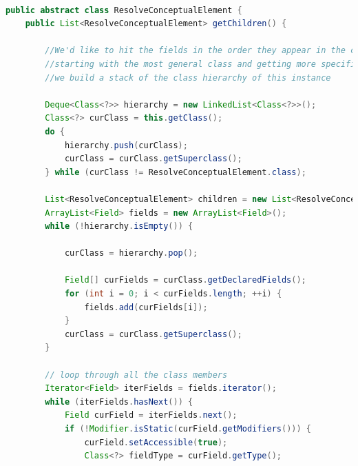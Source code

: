 \documentclass[times]{speauth}
\begin{document}
\begin{lstlisting}[language=java,caption={ResolveConceptualElement.java}]

public abstract class ResolveConceptualElement {
    public List<ResolveConceptualElement> getChildren() {

        //We'd like to hit the fields in the order they appear in the class,
        //starting with the most general class and getting more specific.  So,
        //we build a stack of the class hierarchy of this instance
        
        Deque<Class<?>> hierarchy = new LinkedList<Class<?>>();
        Class<?> curClass = this.getClass();
        do {
            hierarchy.push(curClass);
            curClass = curClass.getSuperclass();
        } while (curClass != ResolveConceptualElement.class);

        List<ResolveConceptualElement> children = new List<ResolveConceptualElement>();
        ArrayList<Field> fields = new ArrayList<Field>();
        while (!hierarchy.isEmpty()) {

            curClass = hierarchy.pop();

            Field[] curFields = curClass.getDeclaredFields();
            for (int i = 0; i < curFields.length; ++i) {
                fields.add(curFields[i]);
            }
            curClass = curClass.getSuperclass();
        }

        // loop through all the class members
        Iterator<Field> iterFields = fields.iterator();
        while (iterFields.hasNext()) {
            Field curField = iterFields.next();
            if (!Modifier.isStatic(curField.getModifiers())) {
                curField.setAccessible(true);
                Class<?> fieldType = curField.getType();


\end{lstlisting}
\end{document}

